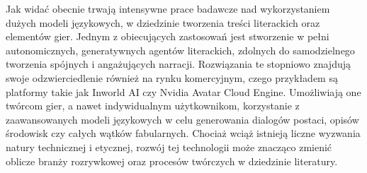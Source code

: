 Jak widać obecnie trwają intensywne prace badawcze nad wykorzystaniem dużych modeli językowych,
w dziedzinie tworzenia treści literackich oraz elementów gier. Jednym z
obiecujących zastosowań jest stworzenie w pełni autonomicznych, generatywnych agentów literackich,
zdolnych do samodzielnego tworzenia spójnych i angażujących narracji. Rozwiązania te stopniowo
znajdują swoje odzwierciedlenie również na rynku komercyjnym, czego przykładem są platformy takie
jak Inworld AI czy Nvidia Avatar Cloud Engine. Umożliwiają one twórcom gier, a nawet indywidualnym
użytkownikom, korzystanie z zaawansowanych modeli językowych w celu generowania dialogów postaci,
opisów środowisk czy całych wątków fabularnych. Chociaż wciąż istnieją liczne wyzwania natury
technicznej i etycznej, rozwój tej technologii może znacząco zmienić oblicze branży rozrywkowej
oraz procesów twórczych w dziedzinie literatury.